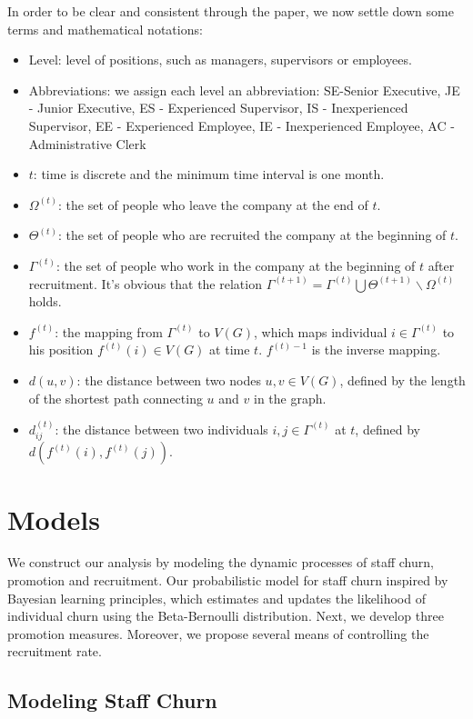 \documentclass[tcn = 37075, sheet = false, abstract = false]{mcmthesis}
\begin{document}
In order to be clear and consistent through the paper, we now settle down some terms and mathematical notations:

\begin{itemize}
\item Level: level of positions, such as managers, supervisors or employees.
\item Abbreviations: we assign each level an abbreviation: SE-Senior Executive, JE -  Junior Executive, ES - Experienced Supervisor, IS - Inexperienced Supervisor, EE - Experienced Employee, IE - Inexperienced Employee, AC - Administrative Clerk
\item $t$: time is discrete and the minimum time interval is one month.
\item $\Omega^{(t)}$: the set of people who leave the company at the end of $t$. \item $\Theta^{(t)}$: the set of people who are recruited the company at the beginning of $t$. 
\item $\Gamma^{(t)}$: the set of people who work in the company at the beginning of $t$ after recruitment. It's obvious that the relation $\Gamma^{(t+1)}=\Gamma^{(t)}\bigcup \Theta ^{(t+1)} \backslash \Omega^{(t)}$ holds.
\item $f^{(t)}$: the mapping from $\Gamma^{(t)}$ to $V(G)$, which maps individual $i\in \Gamma^{(t)}$ to his position $f^{(t)}(i) \in V(G)$ at time $t$. $f^{(t)-1}$ is the inverse mapping.
\item $d(u,v)$: the distance between two nodes $u, v\in V(G)$, defined by the length of the shortest path connecting $u$ and $v$ in the graph.
\item $d_{ij}^{(t)}$: the distance between two individuals $i, j\in  \Gamma^{(t)}$ at $t$, defined by $d(f^{(t)}(i),f^{(t)}(j))$.
\end{itemize}


\section{Models}

We construct our analysis by modeling the dynamic processes of staff churn, promotion and recruitment. Our probabilistic model for staff churn inspired by Bayesian learning principles, which estimates and updates the likelihood of individual churn using the Beta-Bernoulli distribution. Next, we develop three promotion measures. Moreover, we propose several means of controlling the recruitment rate.

\subsection{Modeling Staff Churn}
\end{document}
